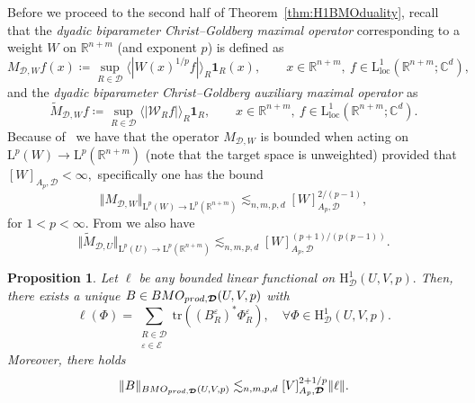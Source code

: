 \documentclass{article}
\newtheorem{proposition}[theorem]{Proposition}
\theoremstyle{definition}
\theoremstyle{remark}
\numberwithin{equation}{section}
\newcommand{\cE}{\mathcal{E}}
\newcommand{\cW}{\mathcal{W}}
\newcommand{\bfD}{\bm{\mathcal{D}}}
\newcommand{\e}{\varepsilon}
\newcommand{\reals}{\mathbb{R}}
\newcommand{\complex}{\mathbb{C}}
\newcommand{\Lp}[1]{\mathrm{L}^{#1}}
\newcommand{\1}{\mathbf{1}}
\begin{document}
    Before we proceed to the second half of Theorem~\ref{thm:H1BMOduality},
    recall that the \emph{dyadic biparameter Christ--Goldberg maximal operator} corresponding to a weight $W$ on $\reals^{n+m}$ (and exponent $p$) is defined as
        \begin{equation*}
            M_{\bfD,W}f(x) \coloneq \sup_{R\in\bfD}\langle|W(x)^{1/p}f|\rangle_{R}\1_{R}(x),\qquad x\in\reals^{n+m},~f\in \mathrm{L}^1_{\mathrm{loc}}(\reals^{n+m};\complex^d),
        \end{equation*}
    and the \emph{dyadic biparameter Christ--Goldberg auxiliary maximal operator} as
        \begin{equation*}
             \widetilde{M}_{\bfD,W}f\coloneq \sup_{R\in\bfD}\langle|\cW_{R}f|\rangle_{R}\1_{R},\qquad x\in\reals^{n+m},~f\in \mathrm{L}^1_{\mathrm{loc}}(\reals^{n+m};\complex^d).
        \end{equation*}
    Because of~\cite[Theorem~1.3]{Vuorinen2024} we have that the operator $M_{\bfD,W}$ is bounded when acting on $\Lp{p}(W) \rightarrow \Lp{p}(\reals^{n+m})$
    (note that the target space is unweighted) provided that $[W]_{A_p,\bfD}<\infty,$ specifically one has the bound
    \begin{equation}
        \label{strong dyadic Christ-Goldberg}
        \Vert M_{\bfD,W}\Vert_{\Lp{p}(W)\rightarrow \Lp{p}(\reals^{n+m})}\lesssim_{n,m,p,d}[W]_{A_p,\bfD}^{2/(p-1)},
    \end{equation}
    for $1<p<\infty.$
    From \cite[Proposition 4.1]{DKPS2024} we also have
        \begin{equation*}
            \Vert \widetilde{M}_{\bfD,U}\Vert_{\Lp{p}(U)\rightarrow \Lp{p}(\reals^{n+m})}\lesssim_{n,m,p,d}[W]_{A_p,\bfD}^{(p+1)/(p(p-1))}.
        \end{equation*}

    \begin{proposition}
        \label{prop:functionaltoBMO}
        Let $\ell$ be any bounded linear functional on $\mathrm{H}^1_{\bfD}(U,V,p).$ Then, there exists a unique $B\in\emph{BMO}_{\emph{prod},\bfD}(U,V,p)$ with
        \begin{equation}
            \label{eq:FunctionalExpression}
            \ell(\Phi)=\sum_{\substack{R\in\bfD\\\e\in\cE}}\mathrm{tr}((B_{R}^{\e})^{\ast}\Phi_{R}^{\e}),\quad\forall\Phi\in \mathrm{H}^1_{\bfD}(U,V,p).
        \end{equation}
        Moreover, there holds
        \begin{equation*}
            \Vert B\Vert_{\emph{BMO}_{\emph{prod},\bfD}(U,V,p)}\lesssim_{n,m,p,d}[V]_{A_{p},\bfD}^{2+1/p}\Vert\ell\Vert.
        \end{equation*}
    \end{proposition}
\end{document}
